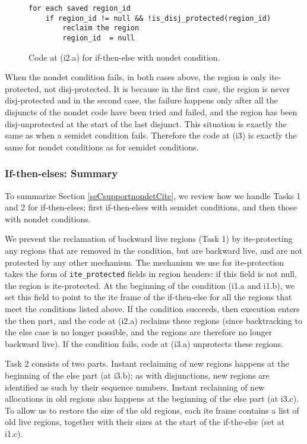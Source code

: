 \documentclass{tlp}
\newcommand{\code}[1]{{\tt#1}}
\begin{document}
\begin{figure}[tb]
\scriptsize
\begin{Verbatim}[frame=single,framerule=0.2pt,framesep=3pt]
for each saved region_id
    if region_id != null && !is_disj_protected(region_id)
        reclaim the region
        region_id  = null
\end{Verbatim}
\small
\caption{Code at (i2.a) for if-then-else with nondet condition.}
\label{fig:supportite:nondet}
\normalsize
\end{figure}

When the nondet condition fails, in both cases above,
the region is only ite-protected, not disj-protected.
It is because in the first case, the region is never disj-protected and
in the second case, the failure happens only after all the disjuncts of the
nondet code have been tried and failed,
and the region has been disj-unprotected at the start of the last disjunct.
This situation is exactly the same as when a semidet condition fails.
Therefore the code at (i3)
is exactly the same for nondet conditions as for semidet conditions.

\subsubsection{If-then-elses: Summary}
To summarize Section \ref{seCsupportnondetCite},
we review how we handle Tasks 1 and 2 for if-then-elses;
first if-then-elses with semidet conditions,
and then those with nondet conditions.

We prevent the reclamation of backward live regions (Task 1)
by ite-protecting any regions that are removed in the condition,
but are backward live, and are not protected by any other mechanism.
The mechanism we use for ite-protection takes the form
of \code{ite\_protected} fields in region headers:
if this field is not null, the region is ite-protected.
At the beginning of the condition (i1.a and i1.b),
we set this field to point to the ite frame of the if-then-else
for all the regions that meet the conditions listed above.
If the condition succeeds, then execution enters the then part,
and the code at (i2.a) reclaims these regions
(since backtracking to the else case is no longer possible,
and the regions are therefore no longer backward live).
If the condition fails, code at (i3.a) unprotects these regions.

Task 2 consists of two parts.
Instant reclaiming of new regions
happens at the beginning of the else part (at i3.b);
as with disjunctions,
new regions are identified as such by their sequence numbers.
Instant reclaiming of new allocations in old regions
also happens at the beginning of the else part (at i3.c).
To allow us to restore the size of the old regions,
each ite frame contains a list of old live regions,
together with their sizes at the start of the if-the-else (set at i1.c).
\end{document}
